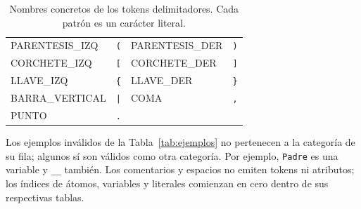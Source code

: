 \begin{table}[H]
\centering
\small
\caption{Nombres concretos de los tokens delimitadores. Cada patrón es un carácter literal.}
\label{tab:delimitadores}
\begin{tabularx}{\textwidth}{Y C{1.3cm} Y C{1.3cm}}
\toprule
{} &  &  &  \\
\midrule
PARENTESIS\_IZQ & \texttt{(} & PARENTESIS\_DER & \texttt{)} \\
 CORCHETE\_IZQ & \texttt{[} & CORCHETE\_DER & \texttt{]} \\
LLAVE\_IZQ & \texttt{\{} & LLAVE\_DER & \texttt{\}} \\
 BARRA\_VERTICAL & \texttt{|} & COMA & \texttt{,} \\
PUNTO & \texttt{.} & & \\
\bottomrule
\end{tabularx}
\end{table}

Los ejemplos inválidos de la Tabla~\ref{tab:ejemplos} no pertenecen a la categoría de su fila; algunos sí son válidos como otra categoría. Por ejemplo, \texttt{Padre} es una variable y \texttt{\_\_} también. Los comentarios y espacios no emiten tokens ni atributos; los índices de átomos, variables y literales comienzan en cero dentro de sus respectivas tablas.

